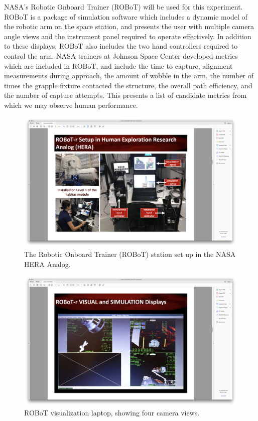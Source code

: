 \documentclass[float=false, crop=false]{standalone}
\begin{document}
NASA’s Robotic Onboard Trainer (ROBoT) will be used for this experiment.
ROBoT is a package of simulation software which includes a dynamic model of the robotic arm on the space station, and presents the user with multiple camera angle views and the instrument panel required to operate effectively.
In addition to these displays, ROBoT also includes the two hand controllers required to control the arm.
NASA trainers at Johnson Space Center developed metrics which are included in ROBoT, and include the time to capture, alignment measurements during approach, the amount of wobble in the arm, the number of times the grapple fixture contacted the structure, the overall path efficiency, and the number of capture attempts.
This presents a list of candidate metrics from which we may observe human performance.

\begin{figure}[tb!]
    \begin{center}
        \includegraphics[trim={13cm 5cm 22cm 15.5cm},clip,width=\linewidth]{./../img/Screen Shot 2018-07-26 at 1.43.16 PM.png}
        \caption{The Robotic Onboard Trainer (ROBoT) station set up in the NASA HERA Analog.}
    \end{center}
\end{figure}

\begin{figure}[tb!]
    \begin{center}
        \includegraphics[trim={13cm 5cm 22cm 15.5cm},clip,width=\linewidth]{./../img/Screen Shot 2018-07-26 at 1.43.02 PM.png}
        \caption{ROBoT visualization laptop, showing four camera views.}
    \end{center}
\end{figure}
\end{document}
